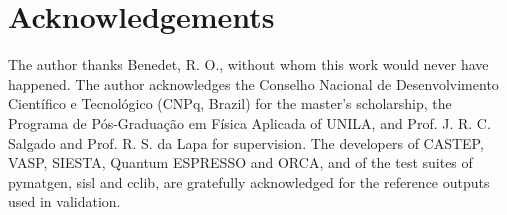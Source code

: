 \section*{Acknowledgements}
The author thanks Benedet, R. O., without whom this work would never have happened. The author acknowledges the Conselho Nacional de Desenvolvimento Científico e Tecnológico (CNPq, Brazil) for the master's scholarship, the Programa de Pós-Graduação em Física Aplicada of UNILA, and Prof. J. R. C. Salgado and Prof. R. S. da Lapa for supervision. The developers of CASTEP, VASP, SIESTA, Quantum ESPRESSO and ORCA, and of the test suites of pymatgen, sisl and cclib, are gratefully acknowledged for the reference outputs used in validation.
